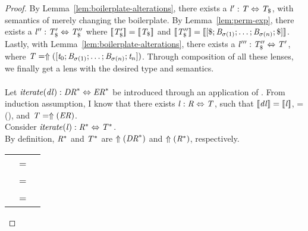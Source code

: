 \documentclass[numbers,10pt,preprint\ifanon ,nocopyrightspace\fi]{sigplanconf}
\begin{document}
\begin{lemma}
\begin{proof}
    By Lemma~\ref{lem:boilerplate-alterations}, there exists a
    $\mathit{l}' : \mathit{T} \Leftrightarrow \mathit{T}_{\$}$, with semantics of
    merely changing the boilerplate.
    By Lemma~\ref{lem:perm-exp}, there exists a $\mathit{l}'' : \mathit{T}_{\$}'
    \Leftrightarrow \mathit{T}_{\$}''$ where
    $[ \! [\mathit{T}_{\$}'] \! ]=[ \! [\mathit{T}_{\$}] \! ]$ and 
    $[ \! [\mathit{T}_{\$}''] \! ]=[ \! [[\$; \mathit{B}_{\sigma(1)} ; \ldots ; \mathit{B}_{\sigma(n)} ; \$]] \! ]$.
    Lastly, with Lemma~\ref{lem:boilerplate-alterations}, there exists a
    $\mathit{l}''' : \mathit{T}_{\$}'' \Leftrightarrow \mathit{T}'$, where
    $\mathit{T} = \Uparrow([\mathit{t}_0; \mathit{B}_{\sigma(1)} ; \ldots ; \mathit{B}_{\sigma(n)} ; \mathit{t}_n])$.
    Through composition of all these lenses, we finally get a lens with the desired type
    and semantics.\\
    \\
    Let $\mathit{\mathit{iterate}(\mathit{dl})} : {\mathit{DR}}^* \Leftrightarrow {\ensuremath{\mathit{ER}}}^*$
    be introduced through an application of \AtomLensRule{}.
    From induction assumption, I know that there exists $\mathit{l} : \mathit{R} \Leftrightarrow \mathit{T}$, such that
    $[ \! [\mathit{dl}] \! ]=[ \! [\mathit{l}] \! ]$,
    \Regex=\ToRegex(\DNFRegex), and
    $\mathit{T}=\Uparrow(\mathit{ER})$.\\
    Consider $\mathit{\mathit{iterate}(\mathit{l})} : {\mathit{R}}^* \Leftrightarrow {\ensuremath{\mathit{T}}}^*$.\\
    By definition, ${\mathit{R}}^*$ and ${\mathit{T}}^*$ are $\Uparrow({\mathit{DR}}^*)$
    and $\Uparrow({\mathit{R}}^*)$, respectively.

    \begin{tabular}{RcL}
      \SemanticsOf{\IterateLensOf{\Lens}} & = &
                                                \\
                                          & = &
                                                \\
                                          & = &
                                                \SemanticsOf{\IterateLensOf{\DNFLens}}
    \end{tabular}
  \end{proof}
\end{lemma}
\end{document}
